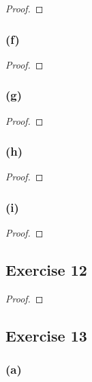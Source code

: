 \documentclass[14pt]{extarticle}
\begin{document}
\begin{proof}

\end{proof}

\subsubsection{(f)}

\begin{proof}

\end{proof}

\subsubsection{(g)}

\begin{proof}

\end{proof}

\subsubsection{(h)}

\begin{proof}

\end{proof}

\subsubsection{(i)}

\begin{proof}

\end{proof}

\subsection{Exercise 12}

\begin{proof}

\end{proof}

\subsection{Exercise 13}

\subsubsection{(a)}
\end{document}
